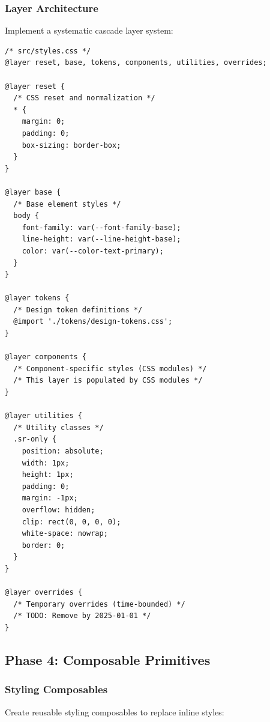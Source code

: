 \documentclass[11pt]{article}
\begin{document}
\subsubsection{Layer Architecture}

Implement a systematic cascade layer system:

\begin{lstlisting}[style=css]
/* src/styles.css */
@layer reset, base, tokens, components, utilities, overrides;

@layer reset {
  /* CSS reset and normalization */
  * {
    margin: 0;
    padding: 0;
    box-sizing: border-box;
  }
}

@layer base {
  /* Base element styles */
  body {
    font-family: var(--font-family-base);
    line-height: var(--line-height-base);
    color: var(--color-text-primary);
  }
}

@layer tokens {
  /* Design token definitions */
  @import './tokens/design-tokens.css';
}

@layer components {
  /* Component-specific styles (CSS modules) */
  /* This layer is populated by CSS modules */
}

@layer utilities {
  /* Utility classes */
  .sr-only {
    position: absolute;
    width: 1px;
    height: 1px;
    padding: 0;
    margin: -1px;
    overflow: hidden;
    clip: rect(0, 0, 0, 0);
    white-space: nowrap;
    border: 0;
  }
}

@layer overrides {
  /* Temporary overrides (time-bounded) */
  /* TODO: Remove by 2025-01-01 */
}
\end{lstlisting}

\subsection{Phase 4: Composable Primitives}

\subsubsection{Styling Composables}

Create reusable styling composables to replace inline styles:
\end{document}
